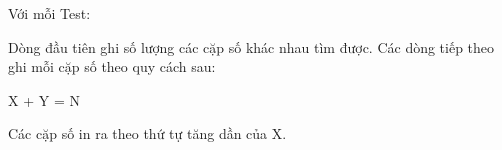 Với mỗi Test:  

   Dòng đầu tiên ghi số lượng các cặp số khác nhau tìm được.  Các dòng tiếp theo ghi mỗi cặp số theo quy cách sau:  

   X + Y = N  

   Các cặp số in ra theo thứ tự tăng dần của X.  

\